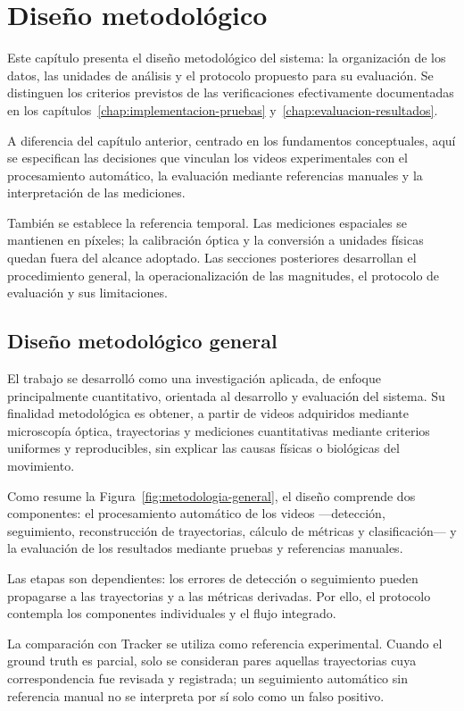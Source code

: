 \chapter{Diseño metodológico}

Este capítulo presenta el diseño metodológico del sistema: la organización de los datos, las unidades de análisis y el protocolo propuesto para su evaluación. Se distinguen los criterios previstos de las verificaciones efectivamente documentadas en los capítulos~\ref{chap:implementacion-pruebas} y~\ref{chap:evaluacion-resultados}.

A diferencia del capítulo anterior, centrado en los fundamentos conceptuales, aquí se especifican las decisiones que vinculan los videos experimentales con el procesamiento automático, la evaluación mediante referencias manuales y la interpretación de las mediciones.

También se establece la referencia temporal. Las mediciones espaciales se mantienen en píxeles; la calibración óptica y la conversión a unidades físicas quedan fuera del alcance adoptado. Las secciones posteriores desarrollan el procedimiento general, la operacionalización de las magnitudes, el protocolo de evaluación y sus limitaciones.

\section{Diseño metodológico general}

El trabajo se desarrolló como una investigación aplicada, de enfoque principalmente cuantitativo, orientada al desarrollo y evaluación del sistema. Su finalidad metodológica es obtener, a partir de videos adquiridos mediante microscopía óptica, trayectorias y mediciones cuantitativas mediante criterios uniformes y reproducibles, sin explicar las causas físicas o biológicas del movimiento.

Como resume la Figura~\ref{fig:metodologia-general}, el diseño comprende dos componentes: el procesamiento automático de los videos —detección, seguimiento, reconstrucción de trayectorias, cálculo de métricas y clasificación— y la evaluación de los resultados mediante pruebas y referencias manuales.

Las etapas son dependientes: los errores de detección o seguimiento pueden propagarse a las trayectorias y a las métricas derivadas. Por ello, el protocolo contempla los componentes individuales y el flujo integrado.

La comparación con Tracker se utiliza como referencia experimental. Cuando el ground truth es parcial, solo se consideran pares aquellas trayectorias cuya correspondencia fue revisada y registrada; un seguimiento automático sin referencia manual no se interpreta por sí solo como un falso positivo.

